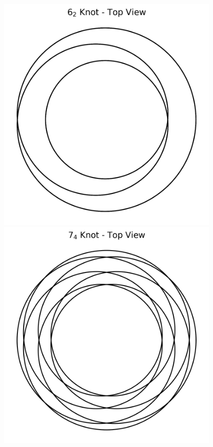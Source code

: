 \documentclass[a4paper,12pt]{article}
\begin{document}
    \begin{figure}[H]
        \centering
        \begin{minipage}{0.25\textwidth}
            \centering
            \includegraphics[width=\textwidth]{knot_6_2_topview}
        \end{minipage}
        \hspace{1em}
        \begin{minipage}{0.25\textwidth}
            \centering
            \includegraphics[width=\textwidth]{knot_7_4_topview}

\end{minipage}
\end{figure}
\end{document}
